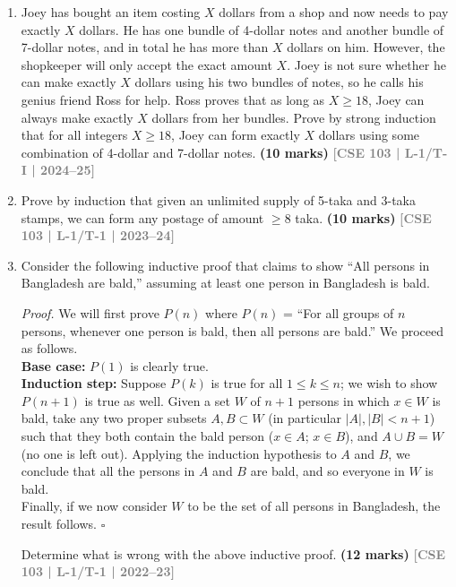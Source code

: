 \documentclass[12pt,a3paper]{article}
\newcommand{\yr}[1]{\hfill\textcolor{gray}{\small\textbf{[#1]}}}
\newcommand{\mk}[1]{\textcolor{orange!70!black}{\small\textbf{(#1 marks)}}}
\begin{document}
\begin{enumerate}


\item Joey has bought an item costing $X$ dollars from a shop and now needs to pay exactly $X$ dollars. He has one bundle of 4-dollar notes and another bundle of 7-dollar notes, and in total he has more than $X$ dollars on him. However, the shopkeeper will only accept the exact amount $X$. Joey is not sure whether he can make exactly $X$ dollars using his two bundles of notes, so he calls his genius friend Ross for help. Ross proves that as long as $X \ge 18$, Joey can always make exactly $X$ dollars from her bundles. Prove by strong induction that for all integers $X \ge 18$, Joey can form exactly $X$ dollars using some combination of 4-dollar and 7-dollar notes.
\mk{10} \yr{CSE 103 | L-1/T-I | 2024--25}

\item Prove by induction that given an unlimited supply of 5-taka and 3-taka stamps, we can form any postage of amount $\geq 8$ taka.
\mk{10} \yr{CSE 103 | L-1/T-1 | 2023--24}

\item Consider the following inductive proof that claims to show ``All persons in Bangladesh are bald,'' assuming at least one person in Bangladesh is bald.\\[6pt]

\begin{tcolorbox}[colback=gray!5,colframe=gray!40,boxrule=0.5pt,arc=4pt,
  left=8pt,right=8pt,top=6pt,bottom=6pt]
  \small
\textit{Proof.} We will first prove $P(n)$ where $P(n)$ = ``For all groups of $n$ persons, whenever one person is bald, then all persons are bald.'' We proceed as follows.\\[3pt]
\textbf{Base case:} $P(1)$ is clearly true.\\[3pt]
\textbf{Induction step:} Suppose $P(k)$ is true for all $1 \leq k \leq n$; we wish to show $P(n+1)$ is true as well. Given a set $W$ of $n+1$ persons in which $x \in W$ is bald, take any two proper subsets $A, B \subset W$ (in particular $|A|, |B| < n+1$) such that they both contain the bald person ($x \in A$; $x \in B$), and $A \cup B = W$ (no one is left out). Applying the induction hypothesis to $A$ and $B$, we conclude that all the persons in $A$ and $B$ are bald, and so everyone in $W$ is bald.\\[3pt]
Finally, if we now consider $W$ to be the set of all persons in Bangladesh, the result follows. $\square$
\end{tcolorbox}
Determine what is wrong with the above inductive proof.
\mk{12} \yr{CSE 103 | L-1/T-1 | 2022--23}



\end{enumerate}
\end{document}
